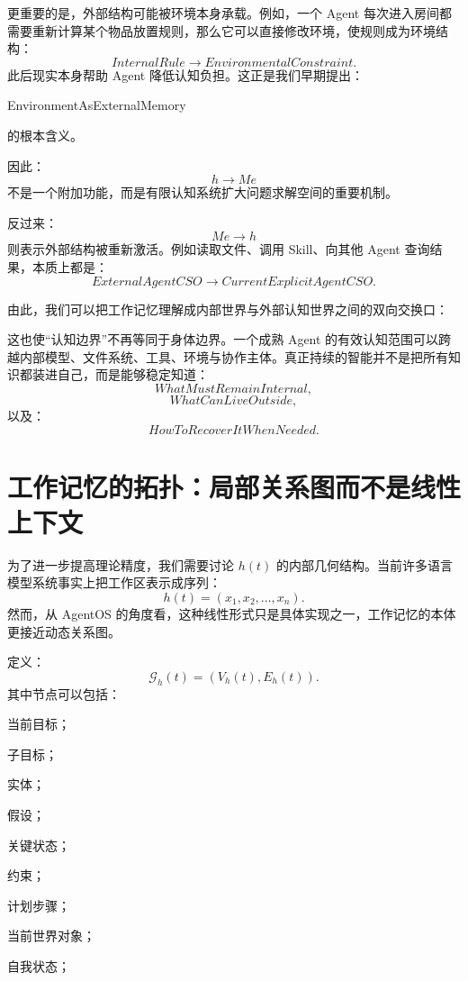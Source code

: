 更重要的是，外部结构可能被环境本身承载。例如，一个 Agent 每次进入房间都需要重新计算某个物品放置规则，那么它可以直接修改环境，使规则成为环境结构：
\[
InternalRule
\rightarrow
EnvironmentalConstraint.
\]
此后现实本身帮助 Agent 降低认知负担。这正是我们早期提出：
\begin{statementbox}
EnvironmentAsExternalMemory
\end{statementbox}
的根本含义。

因此：
\[
h\rightarrow Me
\]
不是一个附加功能，而是有限认知系统扩大问题求解空间的重要机制。

反过来：
\[
Me\rightarrow h
\]
则表示外部结构被重新激活。例如读取文件、调用 Skill、向其他 Agent 查询结果，本质上都是：
\[
ExternalAgentCSO
\rightarrow
CurrentExplicitAgentCSO.
\]

由此，我们可以把工作记忆理解成内部世界与外部认知世界之间的双向交换口：
\begin{statementbox}
\centering
{}
\end{statementbox}

这也使“认知边界”不再等同于身体边界。一个成熟 Agent 的有效认知范围可以跨越内部模型、文件系统、工具、环境与协作主体。真正持续的智能并不是把所有知识都装进自己，而是能够稳定知道：
\[
WhatMustRemainInternal,
\]
\[
WhatCanLiveOutside,
\]
以及：
\[
HowToRecoverItWhenNeeded.
\]

\section{工作记忆的拓扑：局部关系图而不是线性上下文}

为了进一步提高理论精度，我们需要讨论 $h(t)$ 的内部几何结构。当前许多语言模型系统事实上把工作区表示成序列：
\[
h(t)
=
(x_1,x_2,\dots,x_n).
\]
然而，从 AgentOS 的角度看，这种线性形式只是具体实现之一，工作记忆的本体更接近动态关系图。

定义：
\[
\mathcal G_h(t)
=
\left(
V_h(t),
E_h(t)
\right).
\]
其中节点可以包括：

当前目标；

子目标；

实体；

假设；

关键状态；

约束；

计划步骤；

当前世界对象；

自我状态；

